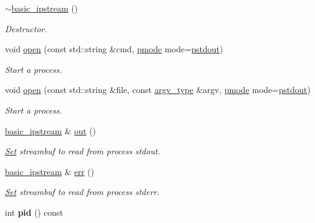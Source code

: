 \begin{DoxyCompactItemize}
\mbox{\hyperlink{classredi_1_1basic__ipstream_a8be5caacc66851d26a8377d90ec1923c}{$\sim$basic\+\_\+ipstream}} ()
\begin{DoxyCompactList}\small\item\em Destructor. \end{DoxyCompactList}\item 
void \mbox{\hyperlink{classredi_1_1basic__ipstream_aadcf86d0692356fef3bb4f1cb59e8a0d}{open}} (const std\+::string \&cmd, \mbox{\hyperlink{structredi_1_1pstreams_a1eae4aad88812af03a0fbb3ec13c50b7}{pmode}} mode=\mbox{\hyperlink{structredi_1_1pstreams_ad3c6d53a98de4566478b1c40c101a42b}{pstdout}})
\begin{DoxyCompactList}\small\item\em Start a process. \end{DoxyCompactList}\item 
void \mbox{\hyperlink{classredi_1_1basic__ipstream_a99a26c32db5009fe0be34efb466a9eea}{open}} (const std\+::string \&file, const \mbox{\hyperlink{structredi_1_1pstreams_af902b894b095c1875e96c10129489467}{argv\+\_\+type}} \&argv, \mbox{\hyperlink{structredi_1_1pstreams_a1eae4aad88812af03a0fbb3ec13c50b7}{pmode}} mode=\mbox{\hyperlink{structredi_1_1pstreams_ad3c6d53a98de4566478b1c40c101a42b}{pstdout}})
\begin{DoxyCompactList}\small\item\em Start a process. \end{DoxyCompactList}\item 
\mbox{\hyperlink{classredi_1_1basic__ipstream}{basic\+\_\+ipstream}} \& \mbox{\hyperlink{classredi_1_1basic__ipstream_a421171ef24c9f6b68b023e5ab30d9581}{out}} ()
\begin{DoxyCompactList}\small\item\em \mbox{\hyperlink{classSet}{Set}} streambuf to read from process\textquotesingle{} {\ttfamily stdout}. \end{DoxyCompactList}\item 
\mbox{\hyperlink{classredi_1_1basic__ipstream}{basic\+\_\+ipstream}} \& \mbox{\hyperlink{classredi_1_1basic__ipstream_a7057a0f44305277d67ee86e653e486e6}{err}} ()
\begin{DoxyCompactList}\small\item\em \mbox{\hyperlink{classSet}{Set}} streambuf to read from process\textquotesingle{} {\ttfamily stderr}. \end{DoxyCompactList}\item 
\mbox{\label{classredi_1_1basic__ipstream_a7476943d0b787cd73695074ce255f69f}} 
int {\bfseries pid} () const
\end{DoxyCompactItemize}
